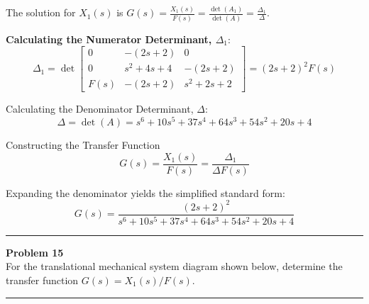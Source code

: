 ﻿\documentclass[11pt]{article}
\newcommand{\hspring}[2]{%
      \draw[spring] (#1) -- ++(2,0) node[midway, above=0.25cm]{#2};
    }
\newcommand{\hdamper}[2]{%
      \begin{scope}[shift={#1}]
        \draw (0,0) -- (0.5,0);                  %
        \draw (0.5,0) -- (0.5,0.3) -- (1.5,0.3);  %
        \draw (0.5,0) -- (0.5,-0.3) -- (1.5,-0.3);%
        
        \draw (1.0,0) -- (1.0,0.15);
        \draw (1.0,0) -- (1.0,-0.15);
        
        \draw (1.0,0) -- (2.0,0);
    
        \node[above] at (1,0.3) {#2};
      \end{scope}
    }
\newcommand{\tbody}[4]{
    \node[tbody] (#4) at (#1) {#2};
    \node at ([yshift=20mm]#4.center) {#3};
    \draw ([yshift=11mm]#4.center) -- ([yshift=18mm]#4.center);
    \draw[->] ([yshift=16mm, xshift=-4mm]#4.center) -- ([yshift=16mm, xshift=5mm]#4.center);
    }
\begin{document}
The solution for $X_1(s)$ is $G(s) = \frac{X_1(s)}{F(s)} = \frac{\det(A_1)}{\det(A)} = \frac{\Delta_1}{\Delta}$.

\vspace{12pt}
\noindent\textbf{Calculating the Numerator Determinant, $\Delta_1$}:
$$ \Delta_1 = \det
\begin{bmatrix}
0 & -(2s + 2) & 0 \\
0 & s^2 + 4s + 4 & -(2s + 2) \\
F(s) & -(2s + 2) & s^2 + 2s + 2
\end{bmatrix}
= (2s + 2)^2F(s) $$

{Calculating the Denominator Determinant, $\Delta$}:
$$\Delta = \det(A) = s^6 + 10s^5 + 37s^4 + 64s^3 + 54s^2 + 20s + 4$$

{Constructing the Transfer Function}
$$G(s) = \frac{X_1(s)}{F(s)} = \frac{\Delta_1}{\Delta F(s)}$$

Expanding the denominator yields the simplified standard form:
\[
\boxed{
G(s) = \frac{(2s + 2)^2}{s^6 + 10s^5 + 37s^4 + 64s^3 + 54s^2 + 20s + 4}
}
\]


\newpage
  \setcounter{page}{24}  
\noindent\rule{\textwidth}{1pt}
\noindent\textbf{Problem 15} \hfill
\\For the translational mechanical system diagram shown below, determine the transfer function $G(s)=X_1(s)/F(s)$.
\begin{center}
\end{center}
\noindent\rule{\textwidth}{1pt}
\end{document}
